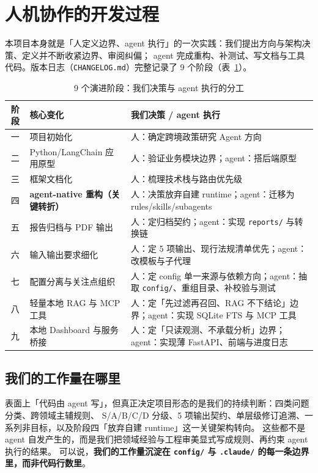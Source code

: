 \documentclass[a4paper,11pt]{ctexart}
\newcommand{\id}[1]{\texttt{#1}}
\begin{document}
\section{人机协作的开发过程}

本项目本身就是「人定义边界、agent 执行」的一次实践：我们提出方向与架构决策、定义并不断收紧边界、审阅纠偏；
agent 完成重构、补测试、写文档与工具代码。版本日志（\id{CHANGELOG.md}）完整记录了 9 个阶段（表~\ref{tab:stages}）。

\begin{table}[h]\centering\small
\caption{9 个演进阶段：我们决策与 agent 执行的分工}\label{tab:stages}
\begin{tabular}{cp{4.5cm}p{8.0cm}}
\toprule
\textbf{阶段} & \textbf{核心变化} & \textbf{我们决策 / agent 执行} \\
\midrule
一 & 项目初始化 & 人：确定跨境政策研究 Agent 方向 \\
二 & Python/LangChain 应用原型 & 人：验证业务模块边界；agent：搭后端原型 \\
三 & 框架文档化 & 人：梳理技术栈与路由优先级 \\
四 & \textbf{agent-native 重构（关键转折）} & 人：决策放弃自建 runtime；agent：迁移为 rules/skills/subagents \\
五 & 报告归档与 PDF 输出 & 人：定归档契约；agent：实现 \id{reports/} 与转换链 \\
六 & 输入输出要求细化 & 人：定 5 项输出、现行法规清单优先；agent：改模板与子代理 \\
七 & 配置分离与关注点组织 & 人：定 config 单一来源与依赖方向；agent：抽取 \id{config/}、重组目录、补校验与测试 \\
八 & 轻量本地 RAG 与 MCP 工具 & 人：定「先过滤再召回、RAG 不下结论」边界；agent：实现 SQLite FTS 与 MCP 工具 \\
九 & 本地 Dashboard 与服务桥接 & 人：定「只读观测、不承载分析」边界；agent：实现薄 FastAPI、前端与进度日志 \\
\bottomrule
\end{tabular}
\end{table}

\subsection{我们的工作量在哪里}
表面上「代码由 agent 写」，但真正决定项目形态的是我们的持续判断：四类问题分类、跨领域主辅规则、
S/A/B/C/D 分级、5 项输出契约、单层级修订追溯、一系列非目标，以及阶段四「放弃自建 runtime」这一关键架构转向。
这些都不是 agent 自发产生的，而是我们把领域经验与工程审美显式写成规则、再约束 agent 执行的结果。
可以说，\textbf{我们的工作量沉淀在 \id{config/} 与 \id{.claude/} 的每一条边界里，而非代码行数里}。
\end{document}
